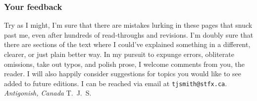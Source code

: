 \subsubsection*{Your feedback}

Try as I might, I'm sure that there are mistakes lurking in these pages that snuck past me, even after hundreds of read-throughs and revisions. I'm doubly sure that there are sections of the text where I could've explained something in a different, clearer, or just plain better way. In my pursuit to expunge errors, obliterate omissions, take out typos, and polish prose, I welcome comments from you, the reader. I will also happily consider suggestions for topics you would like to see added to future editions. I can be reached via email at \texttt{tjsmith@stfx.ca}. \\

\noindent
\textit{Antigonish, Canada} \hfill T.\ J.\ S. \\
\textit{\editionmonth\ \editionyear}